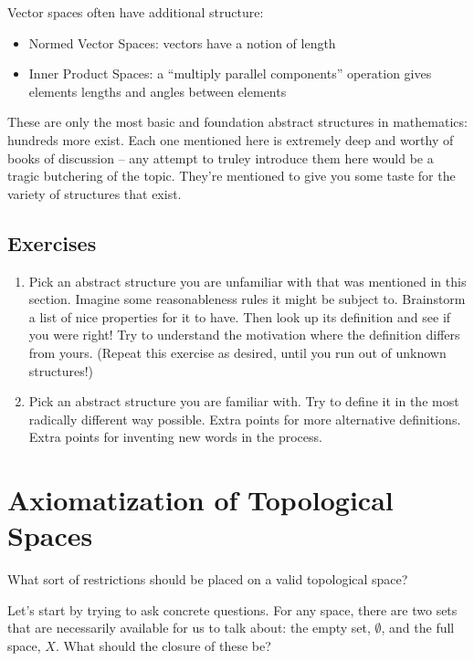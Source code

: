 \documentclass{report}
\begin{document}
Vector spaces often have additional structure:

\begin{itemize}
\item Normed Vector Spaces: vectors have a notion of length
\item Inner Product Spaces: a ``multiply parallel components'' operation gives elements lengths and angles between elements
\end{itemize}

These are only the most basic and foundation abstract structures in mathematics: hundreds more exist. Each one mentioned here is extremely deep and worthy of books of discussion -- any attempt to truley introduce them here would be a tragic butchering of the topic. They're mentioned to give you some taste for the variety of structures that exist. 

\subsection*{Exercises}

\begin{enumerate}

\item Pick an abstract structure you are unfamiliar with that was mentioned in this section. Imagine some reasonableness rules it might be subject to. Brainstorm a list of nice properties for it to have. Then look up its definition and see if you were right! Try to understand the motivation where the definition differs from yours. (Repeat this exercise as desired, until you run out of unknown structures!)

\item Pick an abstract structure you are familiar with. Try to define it in the most radically different way possible. Extra points for more alternative definitions. Extra points for inventing new words in the process.

\end{enumerate}

\section{Axiomatization of Topological Spaces}

What sort of restrictions should be placed on a valid topological space?

Let's start by trying to ask concrete questions. For any space, there are two sets that are necessarily available for us to talk about: the empty set, $∅$, and the full space, $X$. What should the closure of these be?
\end{document}
